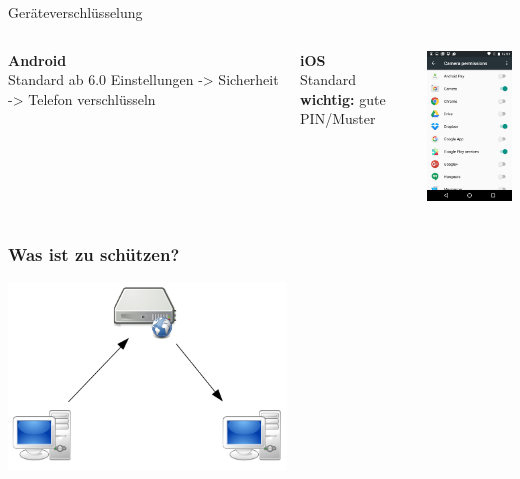 \documentclass[12pt, xcolor={svgnames,table}]{beamer}
\begin{document}
\begin{frame}{Geräteverschlüsselung}
  \begin{columns}
    \column{5.5cm}
    \footnotesize

    \textbf{Android}\\
    Standard ab 6.0
    Einstellungen -> Sicherheit -> Telefon verschlüsseln\\
    \vspace{0.5cm}

    \textbf{iOS}\\
    Standard\\
    \vspace{0.5cm}
    \textbf{wichtig:} gute PIN/Muster

    \column{5cm}

    \begin{center}
      \includegraphics[width=3.5cm]{img/permissions-android.png}
    \par\end{center}
  \end{columns}
\end{frame}

\begin{frame}
    \frametitle{Was ist zu schützen?}
    \begin{center}
      \includegraphics[height=5cm]{img/c-s.png}
    \end{center}
\end{frame}
\end{document}
